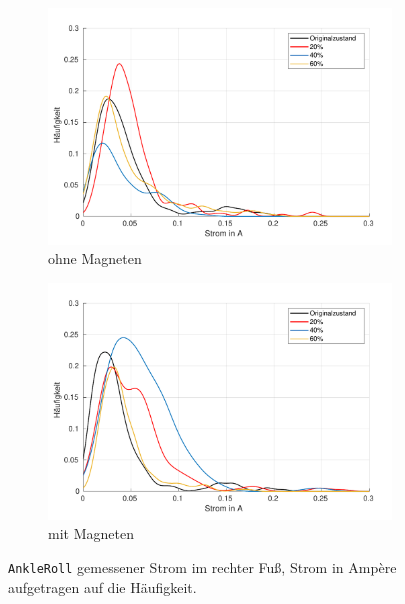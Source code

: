 \begin{figure}[tb]
	\centering
	\begin{subfigure}[c]{.9\linewidth}
		\centering
		\includegraphics[width=\linewidth]{Bilder/rechts_Current_AnkleRoll_ohneM.pdf}
		\caption{ohne Magneten}
	\end{subfigure}
	\hfill
	\begin{subfigure}[c]{.9\linewidth}
		\centering
		\includegraphics[width=\linewidth]{Bilder/rechts_Current_AnkleRoll_mitM.pdf}
		\caption{mit Magneten}
	\end{subfigure}
	\caption{\texttt{AnkleRoll} gemessener Strom im rechter Fuß, Strom in Ampère aufgetragen auf die Häufigkeit.} \label{AnkleRoll_Current_rechts}
\end{figure}
